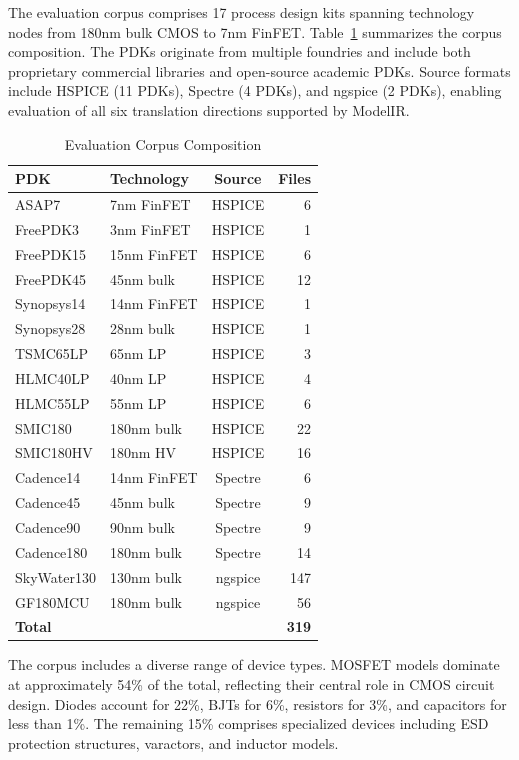 \documentclass[conference]{IEEEtran}
\begin{document}
The evaluation corpus comprises 17 process design kits spanning technology nodes from 180nm bulk CMOS to 7nm FinFET. Table~\ref{tab:corpus} summarizes the corpus composition. The PDKs originate from multiple foundries and include both proprietary commercial libraries and open-source academic PDKs. Source formats include HSPICE (11 PDKs), Spectre (4 PDKs), and ngspice (2 PDKs), enabling evaluation of all six translation directions supported by ModelIR.

\begin{table}[!t]
\caption{Evaluation Corpus Composition}
\label{tab:corpus}
\centering
\renewcommand{\arraystretch}{1.15}
\begin{tabular}{@{}llcr@{}}
\toprule
\textbf{PDK} & \textbf{Technology} & \textbf{Source} & \textbf{Files} \\
\midrule
ASAP7 & 7nm FinFET & HSPICE & 6 \\
FreePDK3 & 3nm FinFET & HSPICE & 1 \\
FreePDK15 & 15nm FinFET & HSPICE & 6 \\
FreePDK45 & 45nm bulk & HSPICE & 12 \\
Synopsys14 & 14nm FinFET & HSPICE & 1 \\
Synopsys28 & 28nm bulk & HSPICE & 1 \\
TSMC65LP & 65nm LP & HSPICE & 3 \\
HLMC40LP & 40nm LP & HSPICE & 4 \\
HLMC55LP & 55nm LP & HSPICE & 6 \\
SMIC180 & 180nm bulk & HSPICE & 22 \\
SMIC180HV & 180nm HV & HSPICE & 16 \\
Cadence14 & 14nm FinFET & Spectre & 6 \\
Cadence45 & 45nm bulk & Spectre & 9 \\
Cadence90 & 90nm bulk & Spectre & 9 \\
Cadence180 & 180nm bulk & Spectre & 14 \\
SkyWater130 & 130nm bulk & ngspice & 147 \\
GF180MCU & 180nm bulk & ngspice & 56 \\
\midrule
\textbf{Total} & & & \textbf{319} \\
\bottomrule
\end{tabular}
\end{table}

The corpus includes a diverse range of device types. MOSFET models dominate at approximately 54\% of the total, reflecting their central role in CMOS circuit design. Diodes account for 22\%, BJTs for 6\%, resistors for 3\%, and capacitors for less than 1\%. The remaining 15\% comprises specialized devices including ESD protection structures, varactors, and inductor models.
\end{document}
